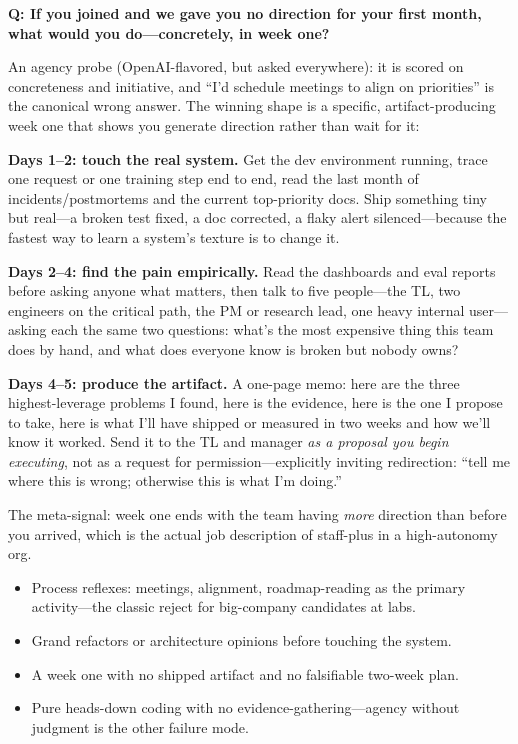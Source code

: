 \begin{interviewq}
\textbf{Q: If you joined and we gave you no direction for your first month, what would you do---concretely, in week one?}

 \quad {} \quad \badgefreq{\freqmed}

\stronganswer

An agency probe (OpenAI-flavored, but asked everywhere): it is scored on concreteness and initiative, and ``I'd schedule meetings to align on priorities'' is the canonical wrong answer. The winning shape is a specific, artifact-producing week one that shows you generate direction rather than wait for it:

\textbf{Days 1--2: touch the real system.} Get the dev environment running, trace one request or one training step end to end, read the last month of incidents/postmortems and the current top-priority docs. Ship something tiny but real---a broken test fixed, a doc corrected, a flaky alert silenced---because the fastest way to learn a system's texture is to change it.

\textbf{Days 2--4: find the pain empirically.} Read the dashboards and eval reports before asking anyone what matters, then talk to five people---the TL, two engineers on the critical path, the PM or research lead, one heavy internal user---asking each the same two questions: what's the most expensive thing this team does by hand, and what does everyone know is broken but nobody owns?

\textbf{Days 4--5: produce the artifact.} A one-page memo: here are the three highest-leverage problems I found, here is the evidence, here is the one I propose to take, here is what I'll have shipped or measured in two weeks and how we'll know it worked. Send it to the TL and manager \textit{as a proposal you begin executing}, not as a request for permission---explicitly inviting redirection: ``tell me where this is wrong; otherwise this is what I'm doing.''

The meta-signal: week one ends with the team having \textit{more} direction than before you arrived, which is the actual job description of staff-plus in a high-autonomy org.

\redflags
\begin{itemize}
    \item Process reflexes: meetings, alignment, roadmap-reading as the primary activity---the classic reject for big-company candidates at labs.
    \item Grand refactors or architecture opinions before touching the system.
    \item A week one with no shipped artifact and no falsifiable two-week plan.
    \item Pure heads-down coding with no evidence-gathering---agency without judgment is the other failure mode.
\end{itemize}


\end{interviewq}
